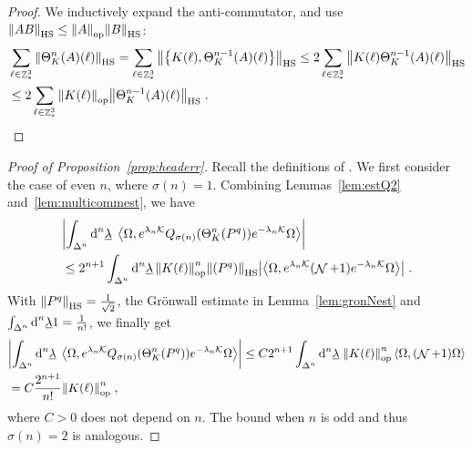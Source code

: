 \documentclass[12pt,a4paper]{article}
\numberwithin{equation}{section}
\newcommand{\cK}{\mathcal{K}}
\newcommand{\ulambda}{\underline{\lambda}}
\newcommand{\1}{\mathbb{I}}
\newcommand{\di}{\textnormal{d}}
\newcommand{\HS}{\mathrm{HS}}
\DeclareMathOperator{\Z}{\mathbb{Z}}
\DeclareMathOperator{\NN}{\mathcal{N}}
\newcommand{\eva}[1]{\left\langle #1 \right\rangle}
\theoremstyle{plain}
\theoremstyle{definition}
\theoremstyle{remark}
\theoremstyle{plain}
\theoremstyle{definition}
\theoremstyle{remark}
\begin{document}
\begin{proof}
We inductively expand the anti-commutator, and use $\norm{AB}_{\HS} \leq \norm{A}_{\mathrm{op}} \norm{B}_{\HS}$:
\begin{equation}
\begin{aligned}
	&\sum\limits_{\ell \in \Z^3_*}\norm{\Theta^{n}_K(A)(\ell)}_{\HS}
	= \sum\limits_{\ell \in \Z^3_*}\norm{\left\{K(\ell),\Theta^{n-1}_K(A)(\ell)\right\}}_{\HS}
    \leq 2 \sum\limits_{\ell \in \Z^3_*}\norm{K(\ell)\Theta^{n-1}_K(A)(\ell)  }_{\HS} \\
	&\leq 2 \sum\limits_{\ell \in \Z^3_*}\norm{K(\ell)}_{\mathrm{op}}\norm{\Theta^{n-1}_K(A)(\ell)}_{\HS} \;.
\end{aligned}
\end{equation}
\end{proof}

\begin{proof}[Proof of Proposition~\ref{prop:headerr}]
Recall the definitions of . We first consider the case of even $n$, where $ \sigma(n) = 1 $. Combining Lemmas~\ref{lem:estQ2} and~\ref{lem:multicommest}, we have
\begin{equation}
\begin{aligned}
	&\abs{\int_{\Delta^n} \di^n \ulambda \;
		\eva{\Omega, e^{\lambda_n \cK} Q_{\sigma(n)}(\Theta^n_{K}(P^q)) e^{-\lambda_n \cK} \Omega} } \\
	&\leq 2^{n+1} \int_{\Delta^n} \di^n \ulambda \,  \norm{K(\ell)}^n_{\mathrm{op}} \norm{(P^q)}_{\HS} 
		\abs{\eva{\Omega, e^{\lambda_n \cK} (\NN +1) e^{-\lambda_n \cK} \Omega}} \;.
\end{aligned}
\end{equation}
With $ \norm{P^q}_{\HS} = \frac{1}{\sqrt{2}}$, the Gr\"onwall estimate in Lemma~\ref{lem:gronNest} and $ \int_{\Delta^n} \di^n\underline{\lambda} 1 = \frac{1}{n!} $, we finally get
\begin{equation}
\begin{aligned}
	&\abs{\int_{\Delta^n} \di^n \ulambda \;
		\eva{\Omega, e^{\lambda_n \cK} Q_{\sigma(n)}(\Theta^n_{K}(P^q)) e^{-\lambda_n \cK} \Omega} }
    \leq C 2^{n+1} \int_{\Delta^n} \di^n \ulambda \; \norm{K(\ell)}^n_{\mathrm{op}} \eva{\Omega,(\NN+1)\Omega} \\
    &= C \frac{2^{n+1}}{n!} \norm{K(\ell)}^n_{\mathrm{op}} \;,
\end{aligned}
\end{equation}
where $ C>0 $ does not depend on $ n $. The bound when $n$ is odd and thus $ \sigma(n) = 2 $ is analogous.
\end{proof}
\end{document}
